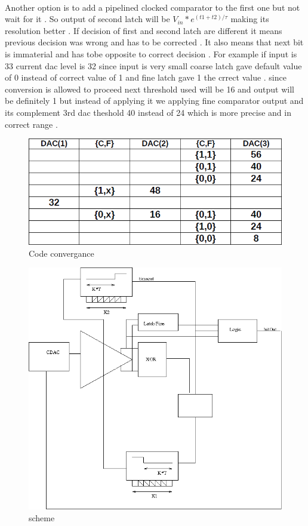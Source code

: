 \documentclass[a4paper,10pt,fleqn,titlepage,twoside]{article}
\begin{document}
\paragraph{}
Another option is to add a pipelined clocked comparator to the first one but not wait for it . So output of second latch will be 
$V_{in}*e^{(t1+t2)/\tau}$ making its resolution better . If decision of first and second latch are different it means previous decision was wrong and has to be corrected . It also means that next bit is immaterial and has tobe opposite to
correct decision  . For example if input is 33 current dac level is 32 since input is very small coarse latch gave default value of 0 instead of correct value of 1 and fine latch gave 1 the crrect value . since conversion is allowed to proceed
next threshold used will be 16 and output will be definitely 1 but instead of applying it we applying fine comparator output and its complement 3rd dac theshold 40 instead of 24 which is more precise and in correct range .
\begin{figure}[p]
\centering
\includegraphics[scale=0.5]{./img/code.png}
\caption{Code convergance}
\label{fig:pipeCmpCodeConveragnce}
\end{figure}
\begin{figure}[p]
\centering
\includegraphics[scale=0.5]{./img/cmpArch.png}
\caption{scheme}
\label{fig:archReinforce}
\end{figure}
\end{document}
